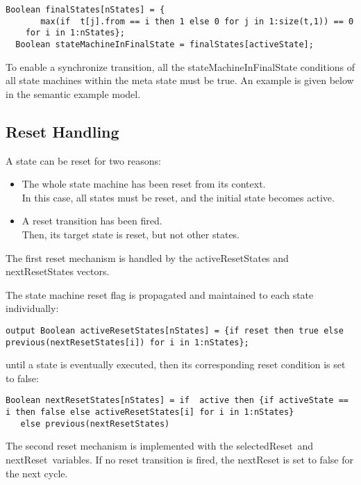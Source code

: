 \begin{lstlisting}[language=modelica]
  Boolean finalStates[nStates] = {
       max(if  t[j].from == i then 1 else 0 for j in 1:size(t,1)) == 0
	for i in 1:nStates};
  Boolean stateMachineInFinalState = finalStates[activeState];
\end{lstlisting}
To enable a synchronize transition, all the stateMachineInFinalState
conditions of all state machines within the meta state must be true. An
example is given below in the semantic example model.

\subsection{Reset Handling}

A state can be reset for two reasons:

\begin{itemize}
\item
  The whole state machine has been reset from its context.\\
  In this case, all states must be reset, and the initial state becomes
  active.
\item
  A reset transition has been fired.\\
  Then, its target state is reset, but not other states.
\end{itemize}

The first reset mechanism is handled by the activeResetStates and
nextResetStates vectors.

The state machine reset flag is propagated and maintained to each state
individually:

\begin{lstlisting}[language=modelica]
  output Boolean activeResetStates[nStates] = {if reset then true else previous(nextResetStates[i]) for i in 1:nStates};
\end{lstlisting}
until a state is eventually executed, then its corresponding reset
condition is set to false:

\begin{lstlisting}[language=modelica]
  Boolean nextResetStates[nStates] = if  active then {if activeState == i then false else activeResetStates[i] for i in 1:nStates}
   else previous(nextResetStates)
\end{lstlisting}
The second reset mechanism is implemented with the selectedReset~and
nextReset~variables. If no reset transition is fired, the nextReset is
set to false for the next cycle.

